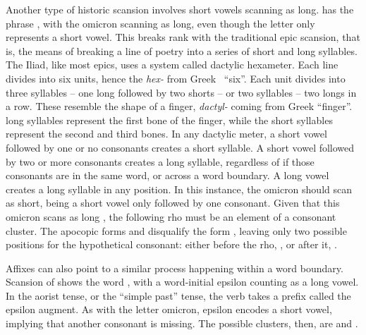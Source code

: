  Another type of historic scansion involves short vowels scanning as long.   has the phrase , with the omicron  scanning as long, even though the letter only represents a short vowel.\autocite[V.803]{Iliad_1999} This breaks rank with the traditional epic scansion, that is, the means of breaking a line of poetry into a series of short and long syllables. The Iliad, like most epics, uses a system called dactylic hexameter. Each line divides into six units, hence the \textit{hex-} from Greek \ ``six''. Each unit divides into three syllables -- one long followed by two shorts -- or two syllables -- two longs in a row. These resemble the shape of a finger, \textit{dactyl-} coming from Greek  ``finger''. long syllables represent the first bone of the finger, while the short syllables represent the second and third bones. In any dactylic meter, a short vowel followed by one or no consonants creates a short syllable. A short vowel followed by two or more consonants creates a long syllable, regardless of if those consonants are in the same word, or across a word boundary. A long vowel creates a long syllable in any position. In this instance, the omicron  should scan as short, being a short vowel only followed by one consonant. Given that this omicron scans as long , the following rho  must be an element of a consonant cluster. The apocopic forms  and  disqualify the form , leaving only two possible positions for the hypothetical consonant: either before the rho, , or after it, .

  Affixes can also point to a similar process happening within a word boundary. Scansion of  shows the word ,\autocite[I.33]{Iliad_1999} with a word-initial epsilon  counting as a long vowel. In the aorist tense, or the ``simple past'' tense, the verb takes a prefix called the epsilon augment. As with the letter omicron, epsilon encodes a short vowel, implying that another consonant is missing. The possible clusters, then, are  and .
